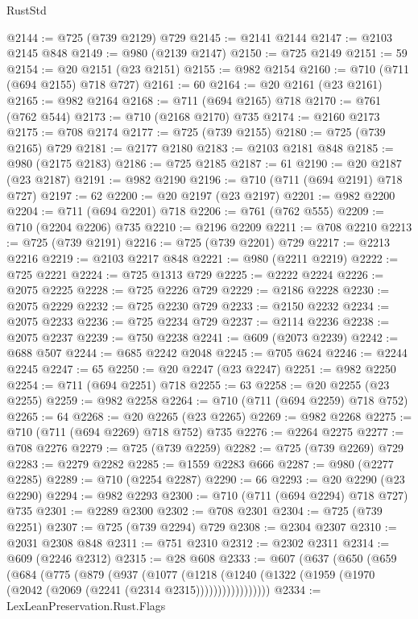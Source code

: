 \begin{lexlean}{RustStd}
\begin{coremodule}
@2144 := @725 (@739 @2129) @729
@2145 := @2141 @2144
@2147 := @2103 @2145 @848
@2149 := @980 (@2139 @2147)
@2150 := @725 @2149
@2151 := 59
@2154 := @20 @2151 (@23 @2151)
@2155 := @982 @2154
@2160 := @710 (@711 (@694 @2155) @718 @727)
@2161 := 60
@2164 := @20 @2161 (@23 @2161)
@2165 := @982 @2164
@2168 := @711 (@694 @2165) @718
@2170 := @761 (@762 @544)
@2173 := @710 (@2168 @2170) @735
@2174 := @2160 @2173
@2175 := @708 @2174
@2177 := @725 (@739 @2155)
@2180 := @725 (@739 @2165) @729
@2181 := @2177 @2180
@2183 := @2103 @2181 @848
@2185 := @980 (@2175 @2183)
@2186 := @725 @2185
@2187 := 61
@2190 := @20 @2187 (@23 @2187)
@2191 := @982 @2190
@2196 := @710 (@711 (@694 @2191) @718 @727)
@2197 := 62
@2200 := @20 @2197 (@23 @2197)
@2201 := @982 @2200
@2204 := @711 (@694 @2201) @718
@2206 := @761 (@762 @555)
@2209 := @710 (@2204 @2206) @735
@2210 := @2196 @2209
@2211 := @708 @2210
@2213 := @725 (@739 @2191)
@2216 := @725 (@739 @2201) @729
@2217 := @2213 @2216
@2219 := @2103 @2217 @848
@2221 := @980 (@2211 @2219)
@2222 := @725 @2221
@2224 := @725 @1313 @729
@2225 := @2222 @2224
@2226 := @2075 @2225
@2228 := @725 @2226 @729
@2229 := @2186 @2228
@2230 := @2075 @2229
@2232 := @725 @2230 @729
@2233 := @2150 @2232
@2234 := @2075 @2233
@2236 := @725 @2234 @729
@2237 := @2114 @2236
@2238 := @2075 @2237
@2239 := @750 @2238
@2241 := @609 (@2073 @2239)
@2242 := @688 @507
@2244 := @685 @2242 @2048
@2245 := @705 @624
@2246 := @2244 @2245
@2247 := 65
@2250 := @20 @2247 (@23 @2247)
@2251 := @982 @2250
@2254 := @711 (@694 @2251) @718
@2255 := 63
@2258 := @20 @2255 (@23 @2255)
@2259 := @982 @2258
@2264 := @710 (@711 (@694 @2259) @718 @752)
@2265 := 64
@2268 := @20 @2265 (@23 @2265)
@2269 := @982 @2268
@2275 := @710 (@711 (@694 @2269) @718 @752) @735
@2276 := @2264 @2275
@2277 := @708 @2276
@2279 := @725 (@739 @2259)
@2282 := @725 (@739 @2269) @729
@2283 := @2279 @2282
@2285 := @1559 @2283 @666
@2287 := @980 (@2277 @2285)
@2289 := @710 (@2254 @2287)
@2290 := 66
@2293 := @20 @2290 (@23 @2290)
@2294 := @982 @2293
@2300 := @710 (@711 (@694 @2294) @718 @727) @735
@2301 := @2289 @2300
@2302 := @708 @2301
@2304 := @725 (@739 @2251)
@2307 := @725 (@739 @2294) @729
@2308 := @2304 @2307
@2310 := @2031 @2308 @848
@2311 := @751 @2310
@2312 := @2302 @2311
@2314 := @609 (@2246 @2312)
@2315 := @28 @608
@2333 := @607
    (@637
      (@650
        (@659
          (@684
            (@775
              (@879
                (@937
                  (@1077
                    (@1218
                      (@1240 (@1322 (@1959 (@1970 (@2042 (@2069 (@2241 (@2314 @2315)))))))))))))))))
@2334 := LexLeanPreservation.Rust.Flags

\end{coremodule}
\end{lexlean}
